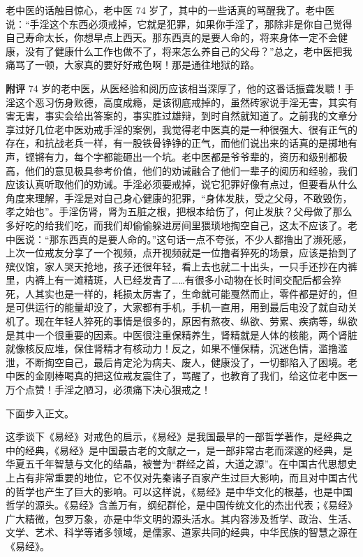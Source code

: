 \begin{case}
    老中医的话触目惊心，老中医 74 岁了，其中的一些话真的骂醒我了。老中医说：“手淫这个东西必须戒掉，它就是犯罪，如果你手淫了，那除非是你自己觉得自己寿命太长，你想早点上西天。那东西真的是要人命的，将来身体一定不会健康，没有了健康什么工作也做不了，将来怎么养自己的父母？”总之，老中医把我痛骂了一顿，大家真的要好好戒色啊！那是通往地狱的路。

    \textbf{附评} 74 岁的老中医，从医经验和阅历应该相当深厚了，他的这番话振聋发聩！手淫这个恶习伤身败德，高度成瘾，是该彻底戒掉的，虽然砖家说手淫无害，其实有害无害，事实会给出答案的，事实胜过雄辩，到时自然就知道了。之前我的文章分享过好几位老中医劝戒手淫的案例，我觉得老中医真的是一种很强大、很有正气的存在，和抗战老兵一样，有一股铁骨铮铮的正气，而他们说出来的话真的是掷地有声，铿锵有力，每个字都能砸出一个坑。老中医都是爷爷辈的，资历和级别都极高，他们的意见极具参考价值，他们的劝诫融合了他们一辈子的阅历和经验，我们应该认真听取他们的劝诫。手淫必须要戒掉，说它犯罪好像有点过，但要看从什么角度来理解，手淫是对自己身心健康的犯罪，“身体发肤，受之父母，不敢毁伤，孝之始也”。手淫伤肾，肾为五脏之根，把根本给伤了，何止发肤？父母做了那么多好吃的给我们吃，而我们却偷偷躲进房间里猥琐地掏空自己，这太不应该了。老中医说：“那东西真的是要人命的。”这句话一点不夸张，不少人都撸出了濒死感，上次一位戒友分享了一个视频，点开视频就是一位撸者猝死的场景，应该是抬到了殡仪馆，家人哭天抢地，孩子还很年轻，看上去也就二十出头，一只手还抄在内裤里，内裤上有一滩精斑，人已经发青了……有很多小动物在长时间交配后都会猝死，人其实也是一样的，耗损太厉害了，生命就可能戛然而止，零件都是好的，但是可供运行的能量却没了，大家都有手机，手机一直用，用到最后电没了就自动关机了。现在年轻人猝死的事情是很多的，原因有熬夜、纵欲、劳累、疾病等，纵欲是其中一个很重要的因素。中医很注重保精养生，肾精就是人体的核能，两个肾脏就像核反应堆，保住肾精才有核动力！反之，如果不懂保精，沉迷色情，滥撸滥泄，不断掏空自己，最后肯定沦为病夫、废人，健康没了，一切都陷入了困境。老中医的金刚棒喝真的把这位戒友震住了，骂醒了，也教育了我们，给这位老中医一万个点赞！手淫之陋习，必须痛下决心狠戒之！
\end{case}

下面步入正文。

这季谈下《易经》对戒色的启示，《易经》是我国最早的一部哲学著作，是经典之中的经典，《易经》是中国最古老的文献之一，是一部非常古老而深邃的经典，是华夏五千年智慧与文化的结晶，被誉为“群经之首，大道之源”。在中国古代思想史上占有非常重要的地位，它不仅对先秦诸子百家产生过巨大影响，而且对中国古代的哲学也产生了巨大的影响。可以这样说，《易经》是中华文化的根基，也是中国哲学的源头。《易经》含盖万有，纲纪群伦，是中国传统文化的杰出代表；《易经》广大精微，包罗万象，亦是中华文明的源头活水。其内容涉及哲学、政治、生活、文学、艺术、科学等诸多领域，是儒家、道家共同的经典，中华民族的智慧之源在《易经》。

